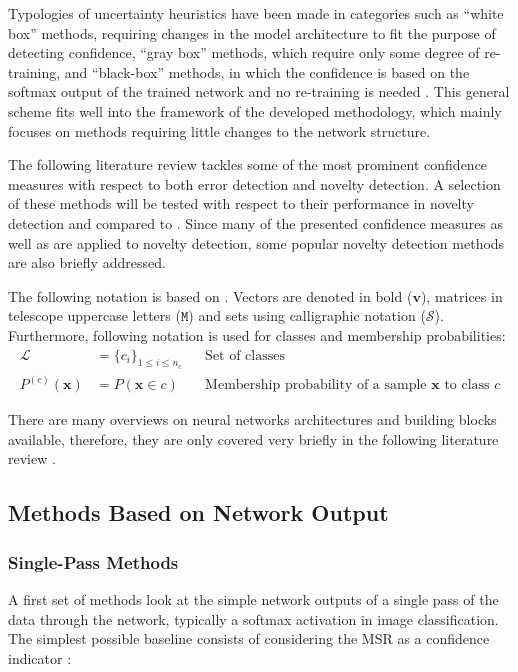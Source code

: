 \documentclass[10pt]{article}
\begin{document}
Typologies of uncertainty heuristics have been made in categories such as ``white box'' methods, requiring changes in the model architecture to fit the purpose of detecting confidence, ``gray box'' methods, which require only some degree of re-training, and ``black-box'' methods, in which the confidence is based on the softmax output of the trained network and no re-training is needed \cite{Bahat_2018}. This general scheme fits well into the framework of the developed methodology, which mainly focuses on methods requiring little changes to the network structure.

The following literature review tackles some of the most prominent confidence measures with respect to both error detection and novelty detection. A selection of these methods will be tested with respect to their performance in novelty detection and compared to . Since many of the  presented confidence measures as well as  are applied to novelty detection, some popular novelty detection methods are also briefly addressed.

The following notation is based on \cite{decisionForests-MSR}. Vectors are denoted in bold ($\mathbf{v}$), matrices in telescope uppercase letters ($\mathtt{M}$) and sets using calligraphic notation ($\mathcal{S}$). Furthermore, following notation is used for classes and membership probabilities:
\begin{align}
\mathcal{L}&=\{c_i\}_{1\leq i\leq n_c}&& \text{Set of classes}\\
P^{(c)}(\mathbf{x})&=P(\mathbf{x}\in c)&& \text{Membership probability of a sample } \mathbf{x} \text{ to class }c
\end{align}

There are many overviews on neural networks architectures and building blocks available, therefore, they are only covered very briefly in the following literature review \cite{Schmidhuber2015DeepLI, Zhu2017DeepLI, Kampffmeyer2016SemanticSO}.

\subsection{Methods Based on Network Output}
\subsubsection{Single-Pass Methods}
A first set of methods look at the simple network outputs of a single pass of the data through the network, typically a softmax activation in image classification. The simplest possible baseline consists of considering the \acrfull{MSR} as a confidence indicator \cite{HendrycksG16c, zaragoza}:
\end{document}
